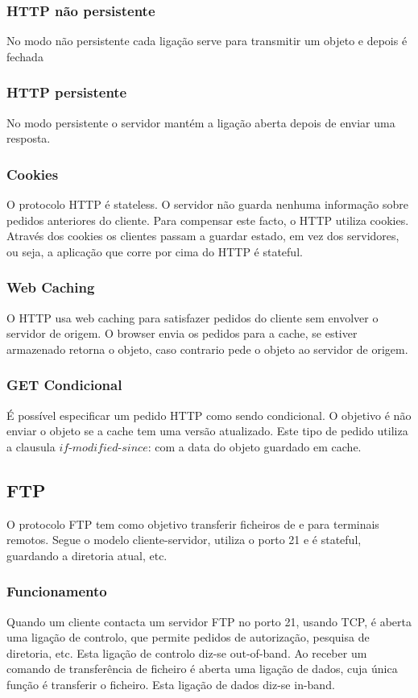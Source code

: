 \documentclass[10pt,a4paper]{report}
\begin{document}
\subsubsection{HTTP não persistente}
No modo não persistente cada ligação serve para transmitir um objeto e depois é fechada
\subsubsection{HTTP persistente}
No modo persistente o servidor mantém a ligação aberta depois de enviar uma resposta.
\subsubsection{Cookies}
O protocolo HTTP é stateless. O servidor não guarda nenhuma informação sobre pedidos anteriores do cliente.
Para compensar este facto, o HTTP utiliza cookies. Através dos cookies os clientes passam a guardar estado, em vez dos servidores, ou seja, a aplicação que corre por cima do HTTP é stateful.
\subsubsection{Web Caching}
O HTTP usa web caching para satisfazer pedidos do cliente sem envolver o servidor de origem. O browser envia os pedidos para a cache, se estiver armazenado retorna o objeto, caso contrario pede o objeto ao servidor de origem.
\subsubsection{GET Condicional}
É possível especificar um pedido HTTP como sendo condicional. O objetivo é não enviar o objeto se a cache tem uma versão atualizado. Este tipo de pedido utiliza a clausula $if$-$modified$-$since$: com a data do objeto guardado em cache.
\subsection{FTP}
O protocolo FTP tem como objetivo transferir ficheiros de e para terminais remotos. Segue o modelo cliente-servidor, utiliza o porto 21 e é stateful, guardando a diretoria atual, etc.
\subsubsection{Funcionamento}
Quando um cliente contacta um servidor FTP no porto 21, usando TCP, é aberta uma ligação de controlo, que permite pedidos de autorização, pesquisa de diretoria, etc. Esta ligação de controlo diz-se out-of-band.
Ao receber um comando de transferência de ficheiro é aberta uma ligação de dados, cuja única função é transferir o ficheiro. Esta ligação de dados diz-se in-band.
\end{document}
